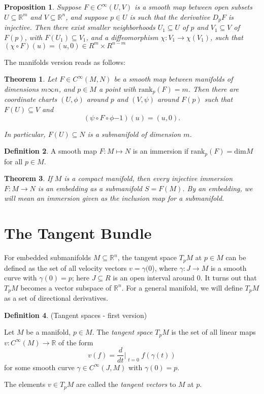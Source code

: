 \documentclass{article}
\newtheorem{theorem}{Theorem}[section]
\newtheorem{proposition}{Proposition}[theorem]
\theoremstyle{definition}
\newtheorem{defn}[theorem]{Definition}
\newenvironment{definition}
  {\vspace{8pt}\begin{mdframed}[backgroundcolor=blueish,innertopmargin=4]\begin{defn}}
  {\end{defn}\end{mdframed}\vspace{4pt}}
\begin{document}
\begin{proposition}
Suppose $F \in C^\infty(U,V)$ is a smooth map between open subsets $U \subseteq \mathbb R^m$ and $V \subseteq \mathbb R^n$, and suppose $p \in U$ is such that the derivative $D_p F$ is injective. Then there exist smaller neighborhoods $U_1 \subseteq U$ of $p$ and $V_1 \subseteq V$ of $F(p)$, with $F(U_1) \subseteq V_1$, and a diffeomorphism $\chi : V_1 \rightarrow \chi(V_1)$, such that $(\chi \circ F)(u) = (u,0) \in R^m \times R^{n-m}$
\end{proposition}

The manifolds version reads as follows: 
\begin{theorem}
Let $F \in C^\infty(M,N)$ be a smooth map between manifolds of dimensions $m \infty n$, and $p \in M$ a point with $\text{rank}_p(F) = m$. Then there are coordinate charts $(U,\phi)$ around $p$ and $(V,\psi)$ around $F(p)$ such that $F(U) \subseteq V$ and 
\[
    (\psi \circ F \circ \phi{-1})(u) = (u,0).
\]

In particular, $F(U) \subseteq N$ is a submanifold of dimension $m$.
\end{theorem}

\begin{definition}
A smooth map $F : M \mapsto N$ is an immersion if $\text{rank}_p(F) = \text{dim}M$ for all $p \in M$.    
\end{definition}

\begin{theorem}
If $M$ is a compact manifold, then every injective immersion $F : M \rightarrow N$ is an embedding as a submanifold $S = F(M)$. By an embedding, we will mean an immersion given as the inclusion map for a submanifold.
\end{theorem}

\newpage
\section{The Tangent Bundle}
For embedded submanifolds $M \subseteq \mathbb R^n$, the tangent space $T_p M$ at $p \in M$ can be defined as the set of all velocity vectors $v = \gamma(0$), where $\gamma : J \rightarrow M$ is a smooth curve with $\gamma(0) = p$; here $J \subseteq R$ is an open interval around $0$. It turns out that $T_pM$ becomes a vector subspace of $\mathbb R^n$. For a general manifold, we will define $T_pM$ as a set of directional derivatives.

\begin{definition} (Tangent spaces - first version)

Let $M$ be a manifold, $p \in M$. The \textit{tangent space} $T_pM$ is the set of all linear maps $v : C^{\infty}(M) \rightarrow \mathbb R$ of the form 
\[
    v(f) = \frac{d}{dt}\Bigr|_{\substack{ t=0 }}  f(\gamma(t))
\]
for some smooth curve $\gamma \in C^\infty(J,M)$ with $\gamma(0) = p$.

The elements $v \in T_pM$ are called the \textit{tangent vectors} to $M$ at $p$.
\end{definition}
\end{document}
